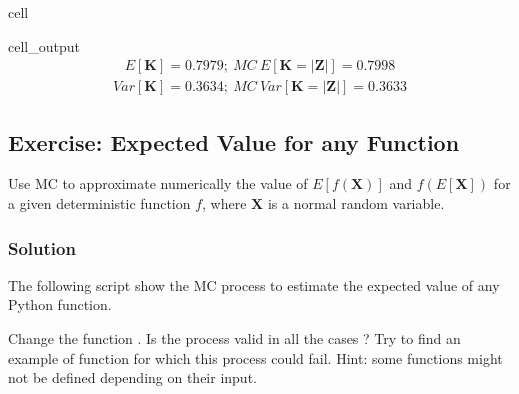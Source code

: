 \documentclass[letterpaper,10pt,english]{jupyterBook}
\begin{document}
\begin{sphinxuseclass}{cell}
\begin{sphinxVerbatimOutput}
\begin{sphinxuseclass}{cell_output}\begin{equation*}
\begin{split}\displaystyle E[\mathbf K] = 0.7979;\ MC\ E[\mathbf K=|\mathbf Z|] = 0.7998\end{split}
\end{equation*}\begin{equation*}
\begin{split}\displaystyle Var[\mathbf K] = 0.3634;\ MC\ Var[\mathbf K=|\mathbf Z|] = 0.3633\end{split}
\end{equation*}
\end{sphinxuseclass}\end{sphinxVerbatimOutput}

\end{sphinxuseclass}

\subsection{Exercise: Expected Value for any Function}
\label{\detokenize{01:exercise-expected-value-for-any-function}}
\sphinxAtStartPar
Use MC to approximate numerically the value of \(E[f({\mathbf X})]\) and \(f(E[{\mathbf X}])\) for a given deterministic function \(f\), where \({\mathbf X}\) is a normal random variable.


\subsubsection{Solution}
\label{\detokenize{01:id5}}
\sphinxAtStartPar
The following script show the MC process to estimate the expected value of any Python function.

\begin{sphinxShadowBox}
\sphinxstylesidebartitle{}

\sphinxAtStartPar
Change the function . Is the process valid in all the cases ? Try to find an example of function for which this process could fail. Hint: some functions might not be defined depending on their input.
\end{sphinxShadowBox}
\end{document}

